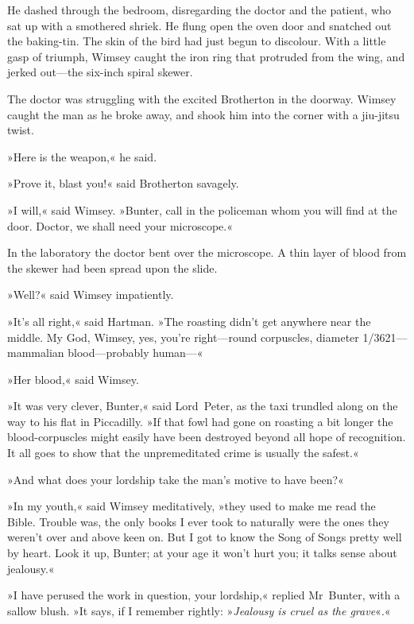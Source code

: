 He dashed through the bedroom, disregarding the doctor and the patient, who sat up with a smothered shriek. He flung open the oven door and snatched out the baking-tin. The skin of the bird had just begun to discolour. With a little gasp of triumph, Wimsey caught the iron ring that protruded from the wing, and jerked out—the six-inch spiral skewer.

The doctor was struggling with the excited Brotherton in the doorway. Wimsey caught the man as he broke away, and shook him into the corner with a jiu-jitsu twist.

»Here is the weapon,« he said.

»Prove it, blast you!« said Brotherton savagely.

»I will,« said Wimsey. »Bunter, call in the policeman whom you will find at the door. Doctor, we shall need your microscope.«

In the laboratory the doctor bent over the microscope. A thin layer of blood from the skewer had been spread upon the slide.

»Well?« said Wimsey impatiently.

»It's all right,« said Hartman. »The roasting didn't get anywhere near the middle. My God, Wimsey, yes, you're right—round corpuscles, diameter 1/3621—mammalian blood—probably human—«

»Her blood,« said Wimsey.

»It was very clever, Bunter,« said Lord~Peter, as the taxi trundled along on the way to his flat in Piccadilly. »If that fowl had gone on roasting a bit longer the blood-corpuscles might easily have been destroyed beyond all hope of recognition. It all goes to show that the unpremeditated crime is usually the safest.«

»And what does your lordship take the man's motive to have been?«

»In my youth,« said Wimsey meditatively, »they used to make me read the Bible. Trouble was, the only books I ever took to naturally were the ones they weren't over and above keen on. But I got to know the Song of Songs pretty well by heart. Look it up, Bunter; at your age it won't hurt you; it talks sense about jealousy.«

»I have perused the work in question, your lordship,« replied Mr~Bunter, with a sallow blush. »It says, if I remember rightly: »\textit{Jealousy is cruel as the grave}«.«